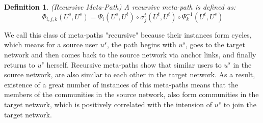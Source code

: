 \documentclass[conference]{IEEEtran}
\newtheorem{definition}{Definition}[section]
\begin{document}
\begin{definition}{(Recursive Meta-Path)}
A recursive meta-path is defined as:
\begin{equation}
\Phi_{i,j,k}(U^s,U^s)=\Psi_i(U^s,U^t)\circ\sigma_j^t(U^t,U^t)\circ\Psi_k^{-1}(U^t,U^s)
\end{equation}
\end{definition}
 
We call this class of meta-paths "recursive" because their instances form cycles, which means for a source user $u^s$, the path begins with  $u^s$, goes to the target network and then comes back to the source network via anchor links, and finally returns to $u^s$ herself. Recursive meta-paths show that similar users to $u^s$ in the source network, are also similar to each other in the target network. As a result, existence of a great number of instances of this meta-paths means that the members of the communities in the source network, also form communities in the target network, which is positively correlated with the intension of $u^s$ to join the target network.
\end{document}
